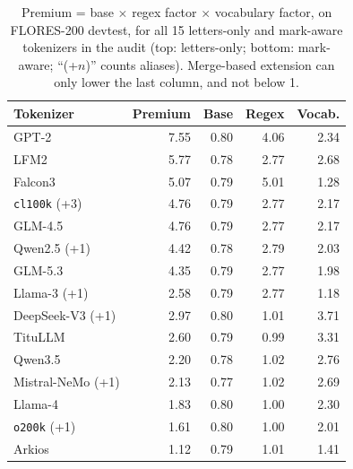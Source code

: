 \begin{table}[!htb]
\centering
\small
\setlength{\tabcolsep}{4pt}
\begin{tabular}{lrrrr}
\toprule
Tokenizer & Premium & Base & Regex & Vocab. \\
\midrule
GPT-2 & 7.55 & 0.80 & 4.06 & 2.34 \\
LFM2 & 5.77 & 0.78 & 2.77 & 2.68 \\
Falcon3 & 5.07 & 0.79 & 5.01 & 1.28 \\
\texttt{cl100k} (+3) & 4.76 & 0.79 & 2.77 & 2.17 \\
GLM-4.5 & 4.76 & 0.79 & 2.77 & 2.17 \\
Qwen2.5 (+1) & 4.42 & 0.78 & 2.79 & 2.03 \\
GLM-5.3 & 4.35 & 0.79 & 2.77 & 1.98 \\
Llama-3 (+1) & 2.58 & 0.79 & 2.77 & 1.18 \\
\midrule
DeepSeek-V3 (+1) & 2.97 & 0.80 & 1.01 & 3.71 \\
TituLLM & 2.60 & 0.79 & 0.99 & 3.31 \\
Qwen3.5 & 2.20 & 0.78 & 1.02 & 2.76 \\
Mistral-NeMo (+1) & 2.13 & 0.77 & 1.02 & 2.69 \\
Llama-4 & 1.83 & 0.80 & 1.00 & 2.30 \\
\texttt{o200k} (+1) & 1.61 & 0.80 & 1.00 & 2.01 \\
Arkios & 1.12 & 0.79 & 1.01 & 1.41 \\
\bottomrule
\end{tabular}
\caption{Premium = base $\times$ regex factor $\times$ vocabulary factor, on FLORES-200 devtest, for all 15 letters-only and mark-aware tokenizers in the audit (top: letters-only; bottom: mark-aware; ``(+$n$)'' counts aliases). Merge-based extension can only lower the last column, and not below 1.}
\label{tab:decomp}
\end{table}
